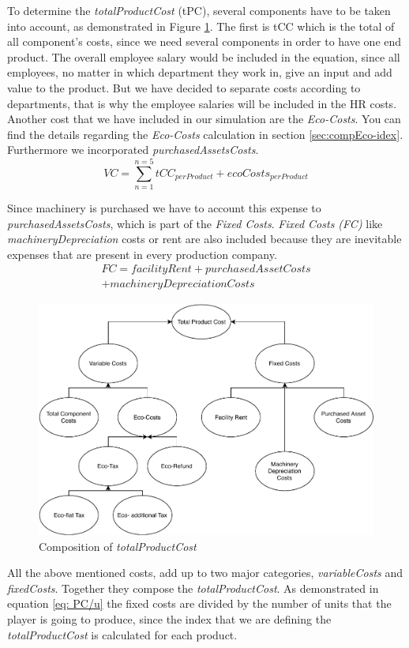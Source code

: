 To determine the \textit{totalProductCost} (\gls{tPC}), several components have to be taken into account, as demonstrated in Figure \ref{fig:productionCosts}. The first is \gls{tCC}
which is the total of all component's costs, since we need several components in order to have one end product. The overall employee salary would be included in the equation, since all employees, no matter in which department they work in, give an input and add value to the product. But we have decided to separate costs according to departments, that is why the employee salaries will be included in the HR costs. Another cost that we have included in our simulation are the \textit{Eco-Costs}. You can find the details regarding the \textit{Eco-Costs} calculation in section \ref{sec:compEco-idex}. Furthermore we incorporated \textit{purchasedAssetsCosts}. 
\begin{equation}
       VC = \sum_{n=1}^{n=5}tCC_{perProduct} + ecoCosts_{perProduct}
   \end{equation}

Since machinery is purchased we have to account this expense to \textit{purchasedAssetsCosts}, which is part of the \textit{Fixed Costs}. \textit{Fixed Costs (FC)} like \textit{machineryDepreciation} costs or rent are also included because they are inevitable expenses that are present in every production company. 
\begin{equation}
   \begin{aligned}
 FC = facilityRent + purchasedAssetCosts \\ +machineryDepreciationCosts
   \end{aligned}
   \end{equation}

\begin{figure}[ht]
	\centering
		\includegraphics[scale=0.65]{images/ProductionCosts.pdf}
	\caption{Composition of \textit{totalProductCost}}
	\label{fig:productionCosts}
\end{figure}
All the above mentioned costs, add up to two major categories, \textit{variableCosts} and \textit{fixedCosts}. Together they compose the \textit{totalProductCost}. As demonstrated in equation \ref{eq: PC/u} the fixed costs are divided by the number of units that the player is going to produce, since the index that we are defining the \textit{totalProductCost} is calculated for each product.
 
